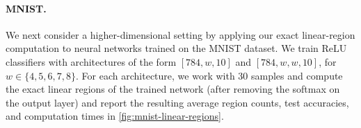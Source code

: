 \documentclass[10pt]{article}
\theoremstyle{definition}
\theoremstyle{remark}
\begin{document}
\paragraph{MNIST.} We next consider a higher-dimensional setting by applying our exact linear-region computation to neural networks trained on the MNIST dataset. We train ReLU classifiers with architectures of the form $[784, w, 10]$ and $[784, w, w, 10]$, for $w \in \{4, 5, 6, 7, 8\}$. For each architecture, we work with 30 samples and compute the exact linear regions of the trained network (after removing the softmax on the output layer) and report the resulting average region counts, test accuracies, and computation times in \cref{fig:mnist-linear-regions}.

\newcommand{\plotmnistseries}[4]{%
    \addplot[#1, filter discard warning=false,
        error bars/.cd,
            y dir=both,
            y explicit,
        /pgfplots/.cd,
        x filter/.code={%
            \ifnum\pdfstrcmp{\thisrow{Activation}}{relu}=0\relax
                \ifnum\thisrow{HiddenLayers}=#3\relax
                \else
                    \def\pgfmathresult{}%
                \fi
            \else
                \def\pgfmathresult{}%
            \fi
        }
    ] table [x=Width, #2, col sep=comma] {#4};%
}
\end{document}
